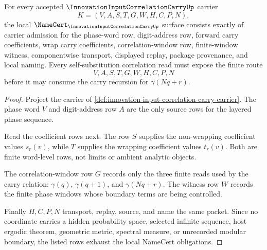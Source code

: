\begin{theorem}
\label{thm:innovation-input-correlation-carry-namecert-obligations}
For every accepted $\InnovationInputCorrelationCarryUp$ carrier
$$
K=(V,A,S,T,G,W,H,C,P,N),
$$
the local $\NameCert_{\InnovationInputCorrelationCarryUp}$ surface consists exactly of carrier admission for the phase-word row, digit-address row, forward carry coefficients, wrap carry coefficients, correlation-window row, finite-window witness, componentwise transport, displayed replay, package provenance, and local naming. Every self-substitution correlation read must expose the finite route
$$
V,A,S,T,G,W,H,C,P,N
$$
before it may consume the carry recursion for $\gamma(Nq+r)$.
\end{theorem}
\begin{proof}
Project the carrier of \autoref{def:innovation-input-correlation-carry-carrier}. The phase word $V$ and digit-address row $A$ are the only source rows for the layered phase sequence.

Read the coefficient rows next. The row $S$ supplies the non-wrapping coefficient values $s_r(v)$, while $T$ supplies the wrapping coefficient values $t_r(v)$. Both are finite word-level rows, not limits or ambient analytic objects.

The correlation-window row $G$ records only the three finite reads used by the carry relation: $\gamma(q)$, $\gamma(q+1)$, and $\gamma(Nq+r)$. The witness row $W$ records the finite phase windows whose boundary terms are being controlled.

Finally $H,C,P,N$ transport, replay, source, and name the same packet. Since no coordinate carries a hidden probability space, selected infinite sequence, host ergodic theorem, geometric metric, spectral measure, or unrecorded modular boundary, the listed rows exhaust the local NameCert obligations.
\end{proof}

